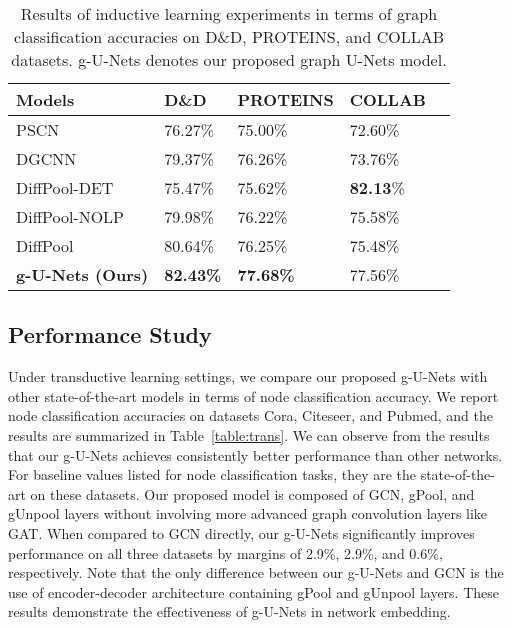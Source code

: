 \documentclass{article}
\begin{document}
\begin{table*}[t]
\centering \caption{Results of inductive learning experiments in
terms of graph classification accuracies on D\&D, PROTEINS, and
COLLAB datasets. g-U-Nets denotes our proposed graph U-Nets model.}
\label{table:induc}
\begin{tabularx}{\textwidth}{  lx{3.5cm}  YYY }
    \hline
    \textbf{Models} & \textbf{D\&D} & \textbf{PROTEINS} & \textbf{COLLAB} \\ \hline\hline
    PSCN~\citep{niepert2016learning}                 & 76.27\% & 75.00\%  & 72.60\%   \\ \hline
    DGCNN~\citep{zhang2018end}                       & 79.37\% & 76.26\%  & 73.76\%   \\ \hline
    DiffPool-DET~\citep{ying2018hierarchical}        & 75.47\% & 75.62\%  & \textbf{82.13}\%   \\ \hline
    DiffPool-NOLP~\citep{ying2018hierarchical}       & 79.98\% & 76.22\%  & 75.58\%   \\ \hline
    DiffPool~\citep{ying2018hierarchical}            & 80.64\% & 76.25\%  & 75.48\%   \\ \hline
    \textbf{g-U-Nets (Ours)}                          & \textbf{82.43\%}
                                                     & \textbf{77.68\%}
                                                     & 77.56\% \\ \hline
    \hline
\end{tabularx}
\end{table*}


\subsection{Performance Study}

Under transductive learning settings, we compare our proposed
g-U-Nets with other state-of-the-art models in terms of node
classification accuracy. We report node classification accuracies on
datasets Cora, Citeseer, and Pubmed, and the results are summarized
in Table~\ref{table:trans}. We can observe from the results that our
g-U-Nets achieves consistently better performance than other
networks. For baseline values listed for node classification tasks,
they are the state-of-the-art on these datasets. Our proposed model
is composed of GCN, gPool, and gUnpool layers without involving more
advanced graph convolution layers like GAT. When compared to GCN
directly, our g-U-Nets significantly improves performance on all
three datasets by margins of 2.9\%, 2.9\%, and 0.6\%, respectively.
Note that the only difference between our g-U-Nets and GCN is the
use of encoder-decoder architecture containing gPool and gUnpool
layers. These results demonstrate the effectiveness of g-U-Nets in
network embedding.
\end{document}
